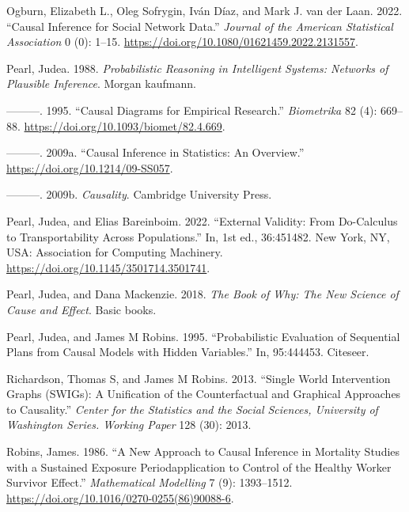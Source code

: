 \documentclass[
  singlecolumn]{article}
\newlength{\cslhangindent}
\newlength{\cslentryspacingunit} %
\newenvironment{CSLReferences}[2] %
 {%
  \setlength{\parindent}{0pt}
  \ifodd #1
  \let\oldpar\par
  \def\par{\hangindent=\cslhangindent\oldpar}
  \fi
  \setlength{\parskip}{#2\cslentryspacingunit}
 }%
 {}
\begin{document}
\begin{CSLReferences}{1}{0}
\leavevmode{}%
Ogburn, Elizabeth L., Oleg Sofrygin, Iván Díaz, and Mark J. van der
Laan. 2022. {``Causal Inference for Social Network Data.''}
\emph{Journal of the American Statistical Association} 0 (0): 1--15.
\url{https://doi.org/10.1080/01621459.2022.2131557}.

\leavevmode{}%
Pearl, Judea. 1988. \emph{Probabilistic Reasoning in Intelligent
Systems: Networks of Plausible Inference}. Morgan kaufmann.

\leavevmode{}%
---------. 1995. {``Causal Diagrams for Empirical Research.''}
\emph{Biometrika} 82 (4): 669--88.
\url{https://doi.org/10.1093/biomet/82.4.669}.

\leavevmode{}%
---------. 2009a. {``Causal Inference in Statistics: An Overview.''}
\url{https://doi.org/10.1214/09-SS057}.

\leavevmode{}%
---------. 2009b. \emph{Causality}. Cambridge University Press.

\leavevmode{}%
Pearl, Judea, and Elias Bareinboim. 2022. {``External Validity: From
Do-Calculus to Transportability Across Populations.''} In, 1st ed.,
36:451482. New York, NY, USA: Association for Computing Machinery.
\url{https://doi.org/10.1145/3501714.3501741}.

\leavevmode{}%
Pearl, Judea, and Dana Mackenzie. 2018. \emph{The Book of Why: The New
Science of Cause and Effect}. Basic books.

\leavevmode{}%
Pearl, Judea, and James M Robins. 1995. {``Probabilistic Evaluation of
Sequential Plans from Causal Models with Hidden Variables.''} In,
95:444453. Citeseer.

\leavevmode{}%
Richardson, Thomas S, and James M Robins. 2013. {``Single World
Intervention Graphs (SWIGs): A Unification of the Counterfactual and
Graphical Approaches to Causality.''} \emph{Center for the Statistics
and the Social Sciences, University of Washington Series. Working Paper}
128 (30): 2013.

\leavevmode{}%
Robins, James. 1986. {``A New Approach to Causal Inference in Mortality
Studies with a Sustained Exposure Period{\textemdash}application to
Control of the Healthy Worker Survivor Effect.''} \emph{Mathematical
Modelling} 7 (9): 1393--1512.
\url{https://doi.org/10.1016/0270-0255(86)90088-6}.


\end{CSLReferences}
\end{document}

